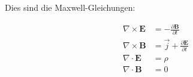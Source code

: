 \documentclass[fleqn]{scrartcl}
\begin{document}
Dies sind die Maxwell-Gleichungen:
\begin{spreadlines}{\baselineskip}
\begin{align}
	\nabla \times \boldsymbol{E} &= -\frac{\partial  \boldsymbol{B}}{\partial t} \\
	\nabla \times \boldsymbol{B} &= \vec{j} + \frac{\partial  \boldsymbol{E}}{\partial t} \\
	\nabla \cdot \boldsymbol{E} &= \rho \\
	\nabla \cdot \boldsymbol{B} &= 0 
\end{align}
\end{spreadlines}
\end{document}
